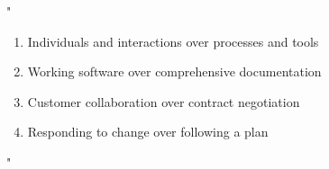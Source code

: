 
"
\begin{enumerate}
    \item  Individuals and interactions over processes and tools
    \item Working software over comprehensive documentation
    \item Customer collaboration over contract negotiation
    \item Responding to change over following a plan 
\end{enumerate}
"
\cite*{beck2001agile}
